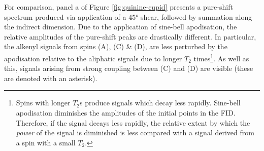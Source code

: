 For comparison, panel a of Figure \ref{fig:quinine-cupid} presents a pure-shift
spectrum produced via application of a \ang{45} shear, followed by summation
along the indirect dimension. Due to the application of sine-bell apodisation,
the relative amplitudes of the pure-shift peaks are drastically different.
In particular, the alkenyl signals from spins (A), (C) \& (D), are less
perturbed by the apodisation relative to the aliphatic signals due to longer
$T_2$ times\footnote{
    Spins with longer $T_2$s produce signals which decay less rapidly.
    Sine-bell apodisation diminishes the amplitudes of the initial points in
    the \ac{FID}. Therefore, if the signal decays less rapidly, the relative
    extent by which the \emph{power} of the signal is diminished is less
    compared with a signal derived from a spin with a small $T_2$.
}. As well as this, signals arising from strong coupling between (C) and
(D) are visible (these are denoted with an asterisk).

